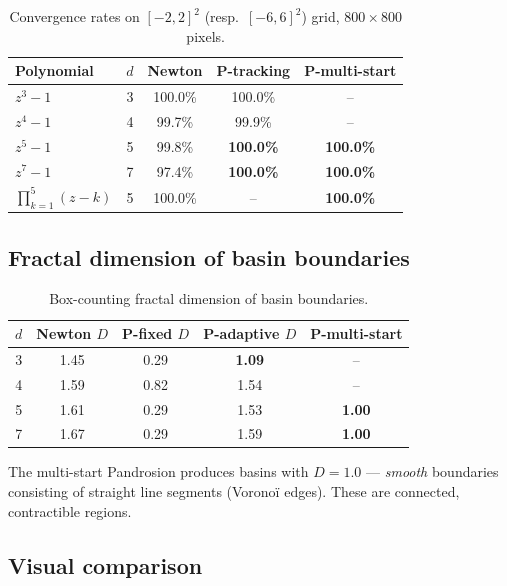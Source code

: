 \documentclass[10pt,a4paper,oneside]{book}
\theoremstyle{definition}
\theoremstyle{remark}
\begin{document}
\begin{table}[h]
\centering
\caption{Convergence rates on $[-2, 2]^2$ (resp.\ $[-6, 6]^2$) grid, $800 \times 800$ pixels.}
\label{tab:convergence}
\begin{tabular}{l c ccc}
\toprule
Polynomial & $d$ & Newton & P-tracking & P-multi-start \\
\midrule
$z^3 - 1$ & 3 & 100.0\% & 100.0\% & -- \\
$z^4 - 1$ & 4 & 99.7\% & 99.9\% & -- \\
$z^5 - 1$ & 5 & 99.8\% & \textbf{100.0\%} & \textbf{100.0\%} \\
$z^7 - 1$ & 7 & 97.4\% & \textbf{100.0\%} & \textbf{100.0\%} \\
\midrule
$\prod_{k=1}^5(z-k)$ & 5 & 100.0\% & -- & \textbf{100.0\%} \\
\bottomrule
\end{tabular}
\end{table}

\subsection{Fractal dimension of basin boundaries}

\begin{table}[h]
\centering
\caption{Box-counting fractal dimension of basin boundaries.}
\label{tab:fractal}
\begin{tabular}{c ccc c}
\toprule
$d$ & Newton $D$ & P-fixed $D$ & P-adaptive $D$ & P-multi-start \\
\midrule
3 & 1.45 & 0.29 & \textbf{1.09} & -- \\
4 & 1.59 & 0.82 & 1.54 & -- \\
5 & 1.61 & 0.29 & 1.53 & \textbf{1.00} \\
7 & 1.67 & 0.29 & 1.59 & \textbf{1.00} \\
\bottomrule
\end{tabular}
\end{table}

The multi-start Pandrosion produces basins with $D = 1.0$ --- \emph{smooth} boundaries consisting of straight line segments (Vorono\"i edges).  These are connected, contractible regions.

\subsection{Visual comparison}
\end{document}
